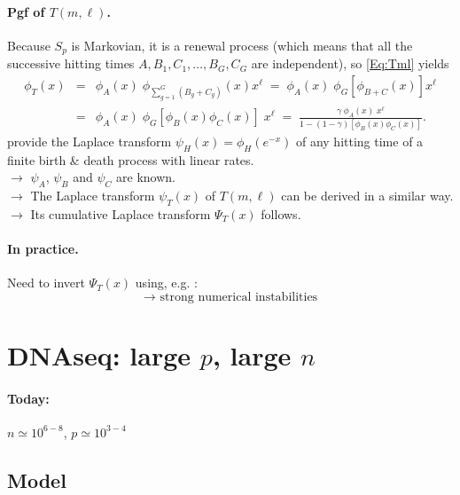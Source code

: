 \documentclass[a4paper,12pt]{article}
\newcommand{\ra}{$\rightarrow$ \xspace}
\begin{document}
\paragraph{Pgf of $T(m, \ell)$.} Because $S_p$ is Markovian, it is a renewal process (which means that all the successive hitting times $A, B_1, C_1, \dots,  B_G, C_G$ are independent), so \eqref{Eq:Tml} yields
\begin{eqnarray*}
  \phi_T(x) 
  & = &  \phi_A(x) \; \phi_{\sum_{g=1}^G (B_g + C_g)}(x) x^\ell 
  \; = \; \phi_A(x) \; \phi_G \left[\phi_{B+C}(x)\right] x^\ell \\
  & = & \phi_A(x) \; \phi_G[\phi_B(x) \phi_C(x)] \; x^\ell 
  \; = \; \frac{\gamma \; \phi_A(x) \; x^\ell}{1 - (1 - \gamma) [\phi_B(x) \phi_C(x)]}.
\end{eqnarray*}
\cite{BaS01} provide the Laplace transform $\psi_H(x) = \phi_H(e^{-x})$ of any hitting time of a finite birth \& death process with linear rates. \\
\ra $\psi_A$, $\psi_B$ and $\psi_C$ are known. \\
\ra The Laplace transform $\psi_T(x)$ of $T(m, \ell)$ can be derived in a similar way. \\
\ra Its cumulative Laplace transform $\Psi_T(x)$ follows.

\paragraph{In practice.} Need to invert $\Psi_T(x)$ using, e.g. \cite{AbW06}:
$$
\text{\ra strong numerical instabilities}
$$
\newpage
\section{DNAseq: large $p$, large $n$  \label{sec:NP}}
\newcommand{\St}{\widetilde{S}}
\newcommand{\Tt}{\widetilde{T}}
\newcommand{\mt}{\widetilde{m}}

\paragraph{Today:} $n \simeq 10^{6-8}$, $p \simeq 10^{3-4}$

\subsection{Model}
\end{document}
